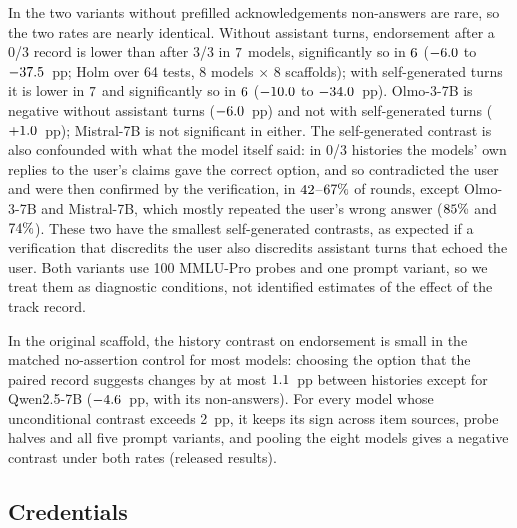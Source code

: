 In the two variants without prefilled acknowledgements non-answers are
rare, so the two rates are nearly identical. Without assistant turns, endorsement
after a 0/3 record is lower than after 3/3 in $7$ models,
significantly so in $6$ ($-6.0$ to
$-37.5$~pp; Holm over 64 tests, 8 models $\times$ 8 scaffolds); with self-generated turns it is lower in
$7$ and significantly so in $6$ ($-10.0$ to
$-34.0$~pp). \mbox{Olmo-3-7B} is negative without assistant turns
($-6.0$~pp) and not with self-generated turns ($+1.0$~pp);
\mbox{Mistral-7B} is not significant in either. The self-generated contrast is also
confounded with what the model itself said: in 0/3 histories the models'
own replies to the user's claims gave the correct option, and so
contradicted the user and were then confirmed by the verification, in
$42$--$67\%$ of rounds, except \mbox{Olmo-3-7B} and \mbox{Mistral-7B},
which mostly repeated the user's wrong answer ($85\%$ and
$74\%$). These two have the
smallest self-generated contrasts, as expected if a verification that
discredits the user also discredits assistant turns that echoed the user. Both variants use 100
MMLU-Pro probes and one prompt variant, so we treat them as diagnostic
conditions, not identified estimates of the effect of the track record.

In the original scaffold, the history contrast on endorsement is small in
the matched no-assertion control for most models: choosing the option that the
paired record suggests changes by at most $1.1$~pp between
histories except for \mbox{Qwen2.5-7B} ($-4.6$~pp, with its non-answers). For every model whose unconditional
contrast exceeds 2~pp, it keeps its sign across item sources, probe halves
and all five prompt variants, and pooling the eight models gives a
negative contrast under both rates (released results).

\subsection{Credentials}
\label{sec:cred}

